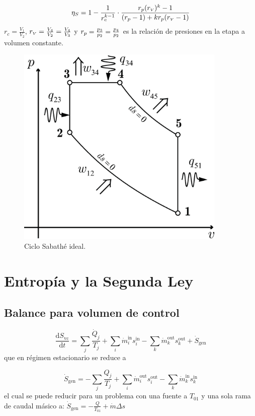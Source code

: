 \documentclass{article}
\newcommand{\ctegas}{k}
\newcommand{\dSgen}{\dot{S}_{\textrm{gen}}}
\newcommand{\entrada}{{\mathrm{in}}}
\newcommand{\salida}{{\mathrm{out}}}
\newcommand{\rc}{r_c}
\newcommand{\rp}{r_{\mbox{\scriptsize$p$}}}
\newcommand{\rv}{r_{\mbox{\tiny$V$}}}
\newcommand{\di}{\textrm{d}}
\begin{document}
\begin{equation}
\eta_S=1-\frac{1}{\rc^{\ctegas -1}}\cdot \frac{\rp(\rv)^\ctegas-1}{(\rp -1)+\ctegas\rp(\rv-1)}
\end{equation}
$\rc=\frac{V_1}{V_2}$, $\rv=\frac{V_4}{V_2}=\frac{V_4}{V_3}$ y $\rp=\frac{p_3}{p_2}=\frac{p_4}{p_2}$ es la relación de presiones en la etapa a volumen constante.
\begin{figure}[htb!]
    \centering
    \includegraphics[width=10cm]{fig/ciclodual.eps}
    \caption{Ciclo Sabathé ideal.}
    \label{fig:dualideal}
\end{figure}

\section{Entropía y la Segunda Ley}

\subsection{Balance para volumen de control}

\begin{equation}
	\frac{\di S_{\mathrm{vc}}}{\di t}=\sum_{j} \frac{\dot{Q}_{j}}{T_{j}}+\sum_{i} \dot{m}^\entrada_{i} s^\entrada_{i}-\sum_{k} \dot{m}^\salida_{k} s^\salida_{k}+\dSgen
\end{equation}
que en régimen estacionario se reduce a

\begin{equation}
	\dSgen = - \sum_{j} \frac{Q_{j}}{T_{j}}+\sum_{i} \dot{m}^\salida_{i} s^\salida_{i}-\sum_{k} \dot{m}^\entrada_{k} s^\entrada_{k}
\end{equation}
el cual se puede reducir para un problema con una fuente a $T_{01}$ y una sola rama de caudal másico a: $\dSgen = -\frac{Q}{T_{01}} +\dot{m} \Delta s $
\end{document}
